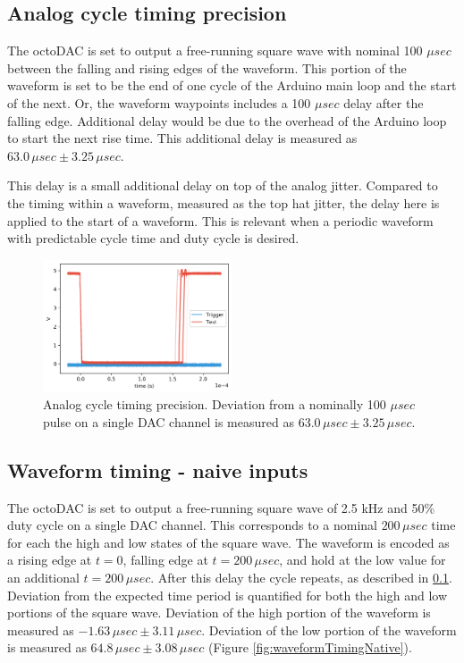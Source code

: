 \documentclass[10pt,a4paper]{article}
\begin{document}
\subsection{Analog cycle timing precision}
\label{subsec:analogCycleJitter}

The octoDAC is set to output a free-running square wave with nominal 100 $\mu sec$ between the falling and rising edges of the waveform.  This portion of the waveform is set to be the end of one cycle of the Arduino main loop and the start of the next.  Or, the waveform waypoints includes a 100 $\mu sec$ delay after the falling edge.  Additional delay would be due to the overhead of the Arduino loop to start the next rise time.  This additional delay is measured as  $63.0\,\mu sec \pm 3.25\, \mu sec$.

This delay is a small additional delay on top of the analog jitter.  Compared to the timing within a waveform, measured as the top hat jitter, the delay here is applied to the start of a waveform.  This is relevant when a periodic waveform with predictable cycle time and duty cycle is desired.

\begin{figure}
	\centering
	\includegraphics[width=0.5\textwidth]{../output/analogCycleJitter.png}
	\caption[analogCycleJitter]{Analog cycle timing precision. Deviation from a nominally 100 $\mu sec$ pulse on a single DAC channel is measured as $63.0\,\mu sec \pm 3.25\, \mu sec$. \newline}
	\label{fig:analogCycleJitter}
\end{figure}

\subsection{Waveform timing - naive inputs}
\label{subsec:waveformNaive}

The octoDAC is set to output a free-running square wave of 2.5 kHz and 50\% duty cycle on a single DAC channel.  This corresponds to a nominal $200\, \mu sec$ time for each the high and low states of the square wave.  The waveform is encoded as a rising edge at $t = 0$, falling edge at $t = 200\, \mu sec$, and hold at the low value for an additional $t = 200\, \mu sec$.  After this delay the cycle repeats, as described in \ref{subsec:analogCycleJitter}.  Deviation from the expected time period is quantified for both the high and low portions of the square wave.  Deviation of the high portion of the waveform is measured as $-1.63 \, \mu sec \pm 3.11 \, \mu sec$.  Deviation of the low portion of the waveform is measured as $64.8\, \mu sec \pm 3.08 \, \mu sec$ (Figure \ref{fig:waveformTimingNative}).
\end{document}
